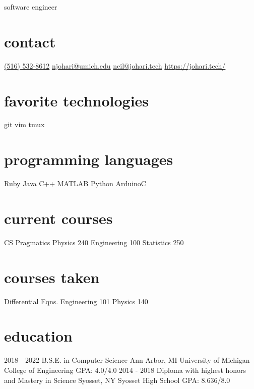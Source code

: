 \documentclass[]{friggeri-cv}
\begin{document}
{\faDesktop\hspace{.2cm} software engineer}


\begin{aside}
    \section{contact}
    \href{tel:+15165328612}{(516) 532-8612}
    \href{mailto:njohari@umich.edu}{njohari@umich.edu}
    \href{mailto:neil@johari.tech}{neil@johari.tech}
    \href{https://johari.tech/}{https://johari.tech/}
    \section{favorite technologies}
    git
    vim
    tmux
    \section{programming languages}
    Ruby
    Java 
    C++
    MATLAB
    Python
    ArduinoC
    \section{current courses}
    CS Pragmatics
    Physics 240
    Engineering 100
    Statistics 250
    \section{courses taken}
    Differential Eqns.
    Engineering 101
    Physics 140
\end{aside}

\section{education}

\begin{entrylist}
    \educationentry
    {2018 - 2022}
    {B.S.E. {\normalfont in Computer Science}}
    {Ann Arbor, MI}
    {University of Michigan College of Engineering}
    {GPA: 4.0/4.0}
    \educationentry
    {2014 - 2018}
    {Diploma {\normalfont with highest honors and Mastery in Science}}
    {Syosset, NY}
    {Syosset High School}
    {GPA: 8.636/8.0}

\end{entrylist}
\end{document}
